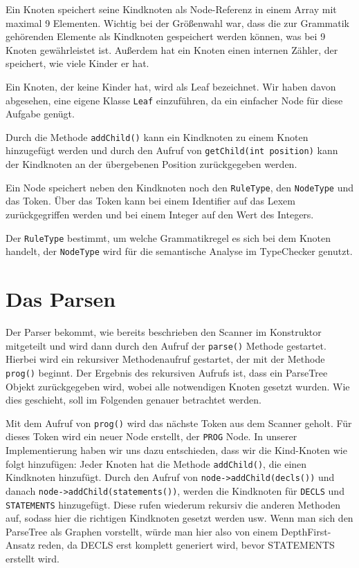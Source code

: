 Ein Knoten speichert seine Kindknoten als Node-Referenz in einem Array mit maximal 9 Elementen. Wichtig bei der Größenwahl war, dass die zur Grammatik gehörenden Elemente als Kindknoten gespeichert werden können, was bei 9 Knoten gewährleistet ist. Außerdem hat ein Knoten einen internen Zähler, der speichert, wie viele Kinder er hat.

Ein Knoten, der keine Kinder hat, wird als Leaf bezeichnet. Wir haben davon abgesehen, eine eigene Klasse \texttt{Leaf} einzuführen, da ein einfacher Node für diese Aufgabe genügt.

Durch die Methode \texttt{addChild()} kann ein Kindknoten zu einem Knoten hinzugefügt werden und durch den Aufruf von \texttt{getChild(int position)} kann der Kindknoten an der übergebenen Position zurückgegeben werden.

Ein Node speichert neben den Kindknoten noch den \texttt{RuleType}, den \texttt{NodeType} und das Token. Über das Token kann bei einem Identifier auf das Lexem zurückgegriffen werden und bei einem Integer auf den Wert des Integers.

Der \texttt{RuleType} bestimmt, um welche Grammatikregel es sich bei dem Knoten handelt, der \texttt{NodeType} wird für die semantische Analyse im TypeChecker genutzt.

\section{Das Parsen}
Der Parser bekommt, wie bereits beschrieben den Scanner im Konstruktor mitgeteilt und wird dann durch den Aufruf der \texttt{parse()} Methode gestartet. Hierbei wird ein rekursiver Methodenaufruf gestartet, der mit der Methode \texttt{prog()} beginnt. Der Ergebnis des rekursiven Aufrufs ist, dass ein ParseTree Objekt zurückgegeben wird, wobei alle notwendigen Knoten gesetzt wurden. Wie dies geschieht, soll im Folgenden genauer betrachtet werden.

Mit dem Aufruf von \texttt{prog()} wird das nächste Token aus dem Scanner geholt. Für dieses Token wird ein neuer Node erstellt, der \texttt{PROG} Node. In unserer Implementierung haben wir uns dazu entschieden, dass wir die Kind-Knoten wie folgt hinzufügen:
Jeder Knoten hat die Methode \texttt{addChild()}, die einen Kindknoten hinzufügt. Durch den Aufruf von \texttt{node->addChild(decls())} und danach \texttt{node->addChild(statements())}, werden die Kindknoten für \texttt{DECLS} und \texttt{STATEMENTS} hinzugefügt. Diese rufen wiederum rekursiv die anderen Methoden auf, sodass hier die richtigen Kindknoten gesetzt werden usw. Wenn man sich den ParseTree als Graphen vorstellt, würde man hier also von einem DepthFirst-Ansatz reden, da DECLS erst komplett generiert wird, bevor STATEMENTS erstellt wird.

